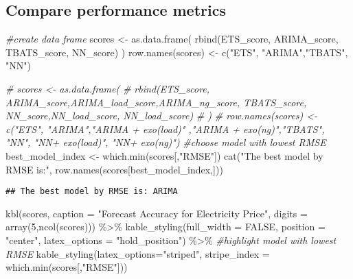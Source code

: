 \documentclass[
]{article}
\newenvironment{Shaded}{\begin{snugshade}}{\end{snugshade}}
\newcommand{\AttributeTok}[1]{\textcolor[rgb]{0.77,0.63,0.00}{#1}}
\newcommand{\CommentTok}[1]{\textcolor[rgb]{0.56,0.35,0.01}{\textit{#1}}}
\newcommand{\ConstantTok}[1]{\textcolor[rgb]{0.00,0.00,0.00}{#1}}
\newcommand{\DecValTok}[1]{\textcolor[rgb]{0.00,0.00,0.81}{#1}}
\newcommand{\FunctionTok}[1]{\textcolor[rgb]{0.00,0.00,0.00}{#1}}
\newcommand{\NormalTok}[1]{#1}
\newcommand{\OtherTok}[1]{\textcolor[rgb]{0.56,0.35,0.01}{#1}}
\newcommand{\SpecialCharTok}[1]{\textcolor[rgb]{0.00,0.00,0.00}{#1}}
\newcommand{\StringTok}[1]{\textcolor[rgb]{0.31,0.60,0.02}{#1}}
\begin{document}
\hypertarget{compare-performance-metrics}{%
\subsection{Compare performance
metrics}\label{compare-performance-metrics}}

\begin{Shaded}
\begin{Highlighting}[]
\CommentTok{\#create data frame}
\NormalTok{scores }\OtherTok{\textless{}{-}} \FunctionTok{as.data.frame}\NormalTok{(}
  \FunctionTok{rbind}\NormalTok{(ETS\_score, ARIMA\_score, TBATS\_score, NN\_score)}
\NormalTok{  )}
\FunctionTok{row.names}\NormalTok{(scores) }\OtherTok{\textless{}{-}} \FunctionTok{c}\NormalTok{(}\StringTok{"ETS"}\NormalTok{, }\StringTok{"ARIMA"}\NormalTok{,}\StringTok{"TBATS"}\NormalTok{, }\StringTok{"NN"}\NormalTok{)}

\CommentTok{\# scores \textless{}{-} as.data.frame(}
\CommentTok{\#   rbind(ETS\_score, ARIMA\_score,ARIMA\_load\_score,ARIMA\_ng\_score, TBATS\_score, NN\_score,NN\_load\_score, NN\_load\_score)}
\CommentTok{\#   )}
\CommentTok{\# row.names(scores) \textless{}{-} c("ETS", "ARIMA","ARIMA + exo(load)" ,"ARIMA + exo(ng)","TBATS", "NN", "NN+ exo(load)", "NN+ exo(ng)")}
\CommentTok{\#choose model with lowest RMSE}
\NormalTok{best\_model\_index }\OtherTok{\textless{}{-}} \FunctionTok{which.min}\NormalTok{(scores[,}\StringTok{"RMSE"}\NormalTok{])}
\FunctionTok{cat}\NormalTok{(}\StringTok{"The best model by RMSE is:"}\NormalTok{, }\FunctionTok{row.names}\NormalTok{(scores[best\_model\_index,]))                       }
\end{Highlighting}
\end{Shaded}

\begin{verbatim}
## The best model by RMSE is: ARIMA
\end{verbatim}

\begin{Shaded}
\begin{Highlighting}[]
\FunctionTok{kbl}\NormalTok{(scores, }
      \AttributeTok{caption =} \StringTok{"Forecast Accuracy for Electricity Price"}\NormalTok{,}
      \AttributeTok{digits =} \FunctionTok{array}\NormalTok{(}\DecValTok{5}\NormalTok{,}\FunctionTok{ncol}\NormalTok{(scores))) }\SpecialCharTok{\%\textgreater{}\%}
  \FunctionTok{kable\_styling}\NormalTok{(}\AttributeTok{full\_width =} \ConstantTok{FALSE}\NormalTok{, }\AttributeTok{position =} \StringTok{"center"}\NormalTok{, }\AttributeTok{latex\_options =} \StringTok{"hold\_position"}\NormalTok{) }\SpecialCharTok{\%\textgreater{}\%}
  \CommentTok{\#highlight model with lowest RMSE}
  \FunctionTok{kable\_styling}\NormalTok{(}\AttributeTok{latex\_options=}\StringTok{"striped"}\NormalTok{, }\AttributeTok{stripe\_index =} \FunctionTok{which.min}\NormalTok{(scores[,}\StringTok{"RMSE"}\NormalTok{]))}
\end{Highlighting}
\end{Shaded}
\end{document}
